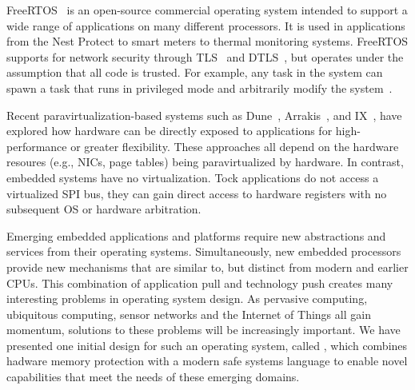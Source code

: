 FreeRTOS~\cite{freertos} is an open-source commercial operating system intended to
support a wide range of applications on many different processors. It
is used in applications from the Nest Protect to smart meters to
thermal monitoring systems. FreeRTOS supports for network security
through TLS~\cite{tls} and DTLS~\cite{dtls}, but operates under the
assumption that all code is trusted. For example, any task in the system
can spawn a task that runs in privileged mode and arbitrarily modify
the system~\cite{rtos-tasks,rtos-sec}.

Recent paravirtualization-based systems such as Dune~\cite{dune:osdi2012},
 Arrakis~\cite{arrakis:osdi2014}, and IX~\cite{ix:osdi2014}, have explored how hardware can
be directly exposed to applications for high-performance or greater
flexibility. These approaches all depend on the hardware resoures (e.g.,
NICs, page tables) being paravirtualized by hardware. In contrast, embedded
systems have no virtualization. Tock applications do not access a virtualized
SPI bus, they can gain direct access to hardware registers with no subsequent
OS or hardware arbitration.

Emerging embedded applications and platforms require new abstractions and
services from their operating systems. Simultaneously, new embedded processors
provide new mechanisms that are similar to, but distinct from modern and
earlier CPUs. This combination of application pull and technology push
creates many interesting problems in operating system design. As pervasive
computing, ubiquitous computing, sensor networks and the Internet of Things
all gain momentum, solutions to these problems will be increasingly 
important. We have presented one initial design for such an operating system,
called \name, which combines hadware memory protection with a modern
safe systems language to enable novel capabilities that meet the needs
of these emerging domains.

